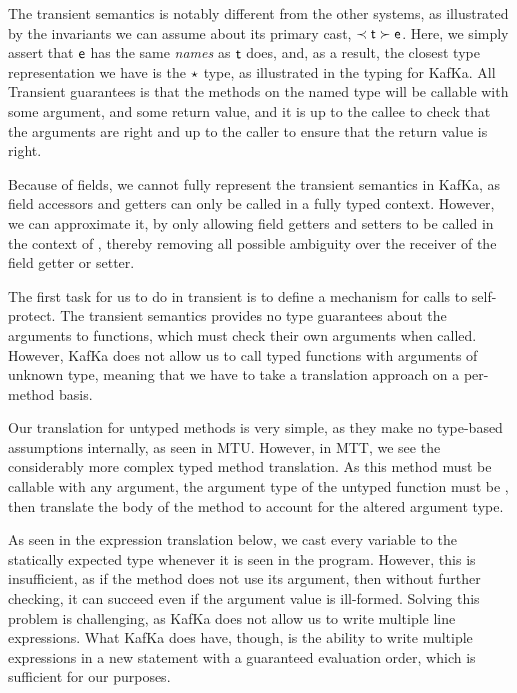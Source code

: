 \documentclass[a4paper,USenglish]{tex/lipics-v2016}
\begin{document}
The transient semantics is notably different from the other systems, as illustrated by the invariants we can assume about its primary cast, $\ShaCast\t\e$. Here, we simply assert that $\e$ has the same \emph{names} as $\t$ does, and, as a result, the closest type representation we have is the $\any$ type, as illustrated in the typing for KafKa. All Transient guarantees is that the methods on the named type will be callable with some argument, and some return value, and it is up to the callee to check that the arguments are right and up to the caller to ensure that the return value is right.

Because of fields, we cannot fully represent the transient semantics in KafKa, as field accessors and getters can only be called in a fully typed context. However, we can approximate it, by only allowing field getters and setters to be called in the context of \this, thereby removing all possible ambiguity over the receiver of the field getter or setter.


\begin{mathpar}

\end{mathpar}

The first task for us to do in transient is to define a mechanism for calls to self-protect. The transient semantics provides no type guarantees about the arguments to functions, which must check their own arguments when called. However, KafKa does not allow us to call typed functions with arguments of unknown type, meaning that we have to take a translation approach on a per-method basis.

Our translation for untyped methods is very simple, as they make no type-based assumptions internally, as seen in MTU. However, in MTT, we see the considerably more complex typed method translation. As this method must be callable with any argument, the argument type of the untyped function must be \any, then translate the body of the method to account for the altered argument type.

As seen in the expression translation below, we cast every variable to the statically expected type whenever it is seen in the program. However, this is insufficient, as if the method does not use its argument, then without further checking, it can succeed even if the argument value is ill-formed. Solving this problem is challenging, as KafKa does not allow us to write multiple line expressions. What KafKa does have, though, is the ability to write multiple expressions in a new statement with a guaranteed evaluation order, which is sufficient for our purposes. 
\end{document}
